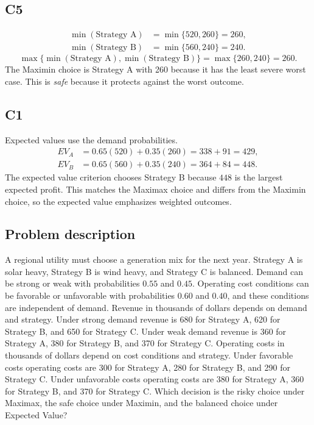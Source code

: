 \begin{ExamProblems}
		\subsection*{C5}
		\[
		\begin{aligned}
		\min(\text{Strategy A}) &= \min\{520,260\} = 260,\\
		\min(\text{Strategy B}) &= \min\{560,240\} = 240.
		\end{aligned}
		\]
		\[
		\max\{\min(\text{Strategy A}), \min(\text{Strategy B})\}
		= \max\{260, 240\}
		= 260.
		\]
		The Maximin choice is Strategy A with 260 because it has the least severe worst case. This is \emph{safe} because it protects against the worst outcome.

		\subsection*{C1}
		Expected values use the demand probabilities.
		\[
		\begin{aligned}
		EV_A &= 0.65(520)+0.35(260)=338+91=429,\\
		EV_B &= 0.65(560)+0.35(240)=364+84=448.
		\end{aligned}
		\]
		The expected value criterion chooses Strategy B because $448$ is the largest expected profit. This matches the Maximax choice and differs from the Maximin choice, so the expected value emphasizes weighted outcomes.

		\item
		\subsection*{Problem description}
		A regional utility must choose a generation mix for the next year. Strategy A is solar heavy, Strategy B is wind heavy, and Strategy C is balanced. Demand can be strong or weak with probabilities $0.55$ and $0.45$. Operating cost conditions can be favorable or unfavorable with probabilities $0.60$ and $0.40$, and these conditions are independent of demand. Revenue in thousands of dollars depends on demand and strategy. Under strong demand revenue is 680 for Strategy A, 620 for Strategy B, and 650 for Strategy C. Under weak demand revenue is 360 for Strategy A, 380 for Strategy B, and 370 for Strategy C. Operating costs in thousands of dollars depend on cost conditions and strategy. Under favorable costs operating costs are 300 for Strategy A, 280 for Strategy B, and 290 for Strategy C. Under unfavorable costs operating costs are 380 for Strategy A, 360 for Strategy B, and 370 for Strategy C. Which decision is the risky choice under Maximax, the safe choice under Maximin, and the balanced choice under Expected Value?


\end{ExamProblems}
